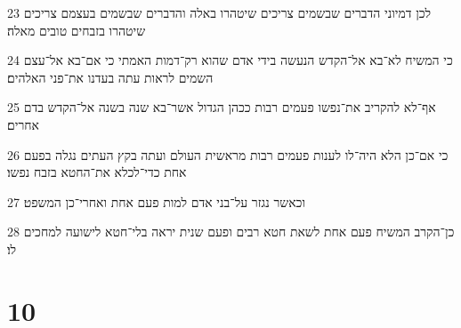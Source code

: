 \par 23 לכן דמיוני הדברים שבשמים צריכים שיטהרו באלה והדברים שבשמים בעצמם צריכים שיטהרו בזבחים טובים מאלה׃
\par 24 כי המשיח לא־בא אל־הקדש הנעשה בידי אדם שהוא רק־דמות האמתי כי אם־בא אל־עצם השמים לראות עתה בעדנו את־פני האלהים׃
\par 25 אף־לא להקריב את־נפשו פעמים רבות ככהן הגדול אשר־בא שנה בשנה אל־הקדש בדם אחרים׃
\par 26 כי אם־כן הלא היה־לו לענות פעמים רבות מראשית העולם ועתה בקץ העתים נגלה בפעם אחת כדי־לכלא את־החטא בזבח נפשו׃
\par 27 וכאשר נגזר על־בני אדם למות פעם אחת ואחרי־כן המשפט׃
\par 28 כן־הקרב המשיח פעם אחת לשאת חטא רבים ופעם שנית יראה בלי־חטא לישועה למחכים לו׃

\chapter{10}

